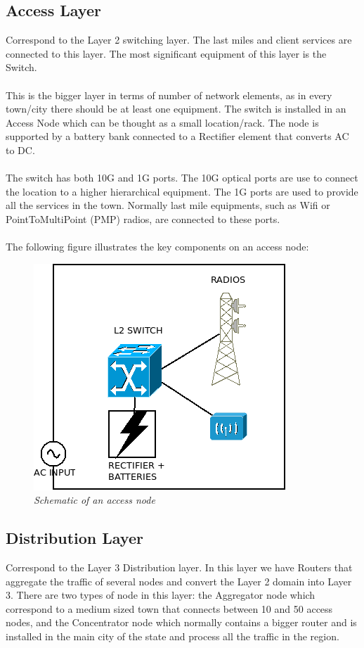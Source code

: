 \documentclass[10pt,a4paper]{report}
\begin{document}
\subsection{Access Layer}
Correspond to the Layer 2 switching layer. The last miles and client services are connected to this layer. The most significant equipment of this layer is the Switch.
\\\\
This is the bigger layer in terms of number of network elements, as in every town/city there should be at least one equipment. The switch is installed in an Access Node which can be thought as a small location/rack. The node is supported by a battery bank connected to a Rectifier element that converts AC to DC.
\\\\
The switch has both 10G and 1G ports. The 10G optical ports are use to connect the location to a higher hierarchical equipment. The 1G ports are used to provide all the services in the town. Normally last mile equipments, such as Wifi or PointToMultiPoint (PMP) radios, are connected to these ports.
\\\\
The following figure illustrates the key components on an access node:
\begin{figure}[H]
 \includegraphics[scale=0.4]{access_node.png}
  \centering
  \caption{\textit{Schematic of an access node}}
  \label{fig:network_design}
\end{figure}	


\subsection{Distribution Layer}
Correspond to the Layer 3 Distribution layer. In this layer we have Routers that aggregate the traffic of several nodes and convert the Layer 2 domain into Layer 3. There are two types of node in this layer: the Aggregator node which correspond to a medium sized town that connects between 10 and 50 access nodes, and the Concentrator node which normally contains a bigger router and is installed in the main city of the state and process all the traffic in the region.
\end{document}
